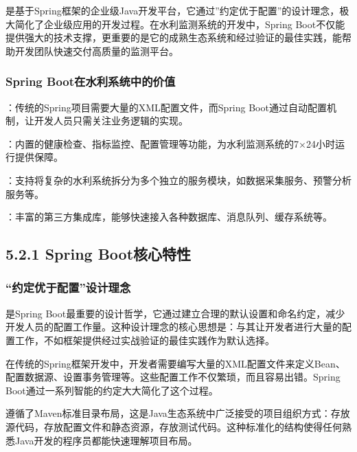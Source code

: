 是基于Spring框架的企业级Java开发平台，它通过''约定优于配置''的设计理念，极大简化了企业级应用的开发过程。在水利监测系统的开发中，Spring Boot不仅能提供强大的技术支撑，更重要的是它的成熟生态系统和经过验证的最佳实践，能帮助开发团队快速交付高质量的监测平台。

\hypertarget{spring-bootux5728ux6c34ux5229ux7cfbux7edfux4e2dux7684ux4ef7ux503c}{%
\subsubsection{Spring Boot在水利系统中的价值}\label{spring-bootux5728ux6c34ux5229ux7cfbux7edfux4e2dux7684ux4ef7ux503c}}

：传统的Spring项目需要大量的XML配置文件，而Spring Boot通过自动配置机制，让开发人员只需关注业务逻辑的实现。

：内置的健康检查、指标监控、配置管理等功能，为水利监测系统的7×24小时运行提供保障。

：支持将复杂的水利系统拆分为多个独立的服务模块，如数据采集服务、预警分析服务等。

：丰富的第三方集成库，能够快速接入各种数据库、消息队列、缓存系统等。

\hypertarget{spring-bootux6838ux5fc3ux7279ux6027}{%
\subsection{5.2.1 Spring Boot核心特性}\label{spring-bootux6838ux5fc3ux7279ux6027}}

\hypertarget{ux7ea6ux5b9aux4f18ux4e8eux914dux7f6eux8bbeux8ba1ux7406ux5ff5}{%
\subsubsection{``约定优于配置''设计理念}\label{ux7ea6ux5b9aux4f18ux4e8eux914dux7f6eux8bbeux8ba1ux7406ux5ff5}}

是Spring Boot最重要的设计哲学，它通过建立合理的默认设置和命名约定，减少开发人员的配置工作量。这种设计理念的核心思想是：与其让开发者进行大量的配置工作，不如框架提供经过实战验证的最佳实践作为默认选择。

在传统的Spring框架开发中，开发者需要编写大量的XML配置文件来定义Bean、配置数据源、设置事务管理等。这些配置工作不仅繁琐，而且容易出错。Spring Boot通过一系列智能的约定大大简化了这个过程。

遵循了Maven标准目录布局，这是Java生态系统中广泛接受的项目组织方式：存放源代码，存放配置文件和静态资源，存放测试代码。这种标准化的结构使得任何熟悉Java开发的程序员都能快速理解项目布局。

